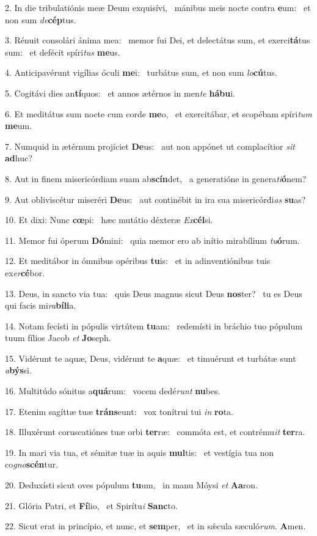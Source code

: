 2. In die tribulatiónis meæ Deum exquisívi, \dag\  mánibus meis nocte contra \textbf{e}um: \ast\  et non sum \textit{de}\textbf{cép}tus.\

3. Rénuit consolári ánima mea: \dag\  memor fui Dei, et delectátus sum, et exerci\textbf{tá}tus sum: \ast\  et defécit spíri\textit{tus} \textbf{me}us.\

4. Anticipavérunt vigílias óculi \textbf{me}i: \ast\  turbátus sum, et non sum \textit{lo}\textbf{cú}tus.\

5. Cogitávi dies an\textbf{tí}quos: \ast\  et annos ætérnos in men\textit{te} \textbf{há}\textbf{bu}i.\

6. Et meditátus sum nocte cum corde \textbf{me}o, \ast\  et exercitábar, et scopébam spíri\textit{tum} \textbf{me}um.\

7. Numquid in ætérnum projíciet \textbf{De}us: \ast\  aut non appónet ut complacítior \textit{sit} \textbf{ad}huc?\

8. Aut in finem misericórdiam suam ab\textbf{scín}det, \ast\  a generatióne in genera\textit{ti}\textbf{ó}nem?\

9. Aut obliviscétur miseréri \textbf{De}us: \ast\  aut continébit in ira sua misericórdi\textit{as} \textbf{su}as?\

10. Et dixi: Nunc \textbf{cœ}pi: \ast\  hæc mutátio déxteræ \textit{Ex}\textbf{cél}si.\

11. Memor fui óperum \textbf{Dó}mini: \ast\  quia memor ero ab inítio mirabílium \textit{tu}\textbf{ó}rum.\

12. Et meditábor in ómnibus opéribus \textbf{tu}is: \ast\  et in adinventiónibus tuis ex\textit{er}\textbf{cé}bor.\

13. Deus, in sancto via tua: \dag\  quis Deus magnus sicut Deus \textbf{nos}ter? \ast\  tu es Deus qui facis mi\textit{ra}\textbf{bí}\textbf{li}a.\

14. Notam fecísti in pópulis virtútem \textbf{tu}am: \ast\  redemísti in bráchio tuo pópulum tuum fílios Jacob \textit{et} \textbf{Jo}seph.\

15. Vidérunt te aquæ, Deus, vidérunt te \textbf{a}quæ: \ast\  et timuérunt et turbátæ sunt \textit{a}\textbf{býs}si.\

16. Multitúdo sónitus a\textbf{quá}rum: \ast\  vocem dedé\textit{runt} \textbf{nu}bes.\

17. Etenim sagíttæ tuæ \textbf{tráns}eunt: \ast\  vox tonítrui tui \textit{in} \textbf{ro}ta.\

18. Illuxérunt coruscatiónes tuæ orbi \textbf{ter}ræ: \ast\  commóta est, et contrému\textit{it} \textbf{ter}ra.\

19. In mari via tua, et sémitæ tuæ in aquis \textbf{mul}tis: \ast\  et vestígia tua non co\textit{gno}\textbf{scén}tur.\

20. Deduxísti sicut oves pópulum \textbf{tu}um, \ast\  in manu Móysi \textit{et} \textbf{A}\textbf{a}ron.\

21. Glória Patri, et \textbf{Fí}lio, \ast\  et Spirítu\textit{i} \textbf{Sanc}to.\

22. Sicut erat in princípio, et nunc, et \textbf{sem}per, \ast\  et in sǽcula sæculó\textit{rum}. \textbf{A}men.\

